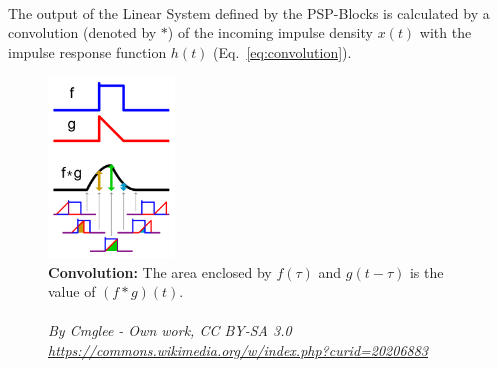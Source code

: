 \\[2em]
The output of the Linear System defined by the PSP-Blocks is calculated by a convolution (denoted by $\ast$) of the
incoming impulse density $x(t)$ with the impulse response function $h(t)$ (Eq.~\ref{eq:convolution}).
\begin{figure}
    \centering
    \includegraphics[width=0.30\textwidth]{Figures/convolution/wikipedia-citation-needed}
    \caption{\textbf{Convolution:} The area enclosed by $f(\tau)$ and $g(t-\tau)$ is the value of $(f\ast g)(t)$.\\
    \hrulefill \\
    \textit{By Cmglee - Own work, CC BY-SA 3.0  \url{https://commons.wikimedia.org/w/index.php?curid=20206883}}}
    \label{fig:Convolution}
\end{figure}

